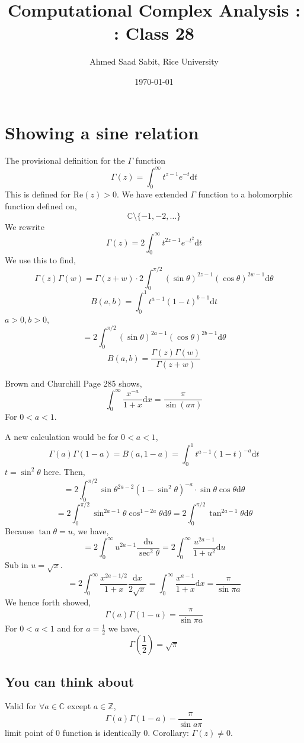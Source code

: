 \documentclass[letter]{article}
\title{Computational Complex Analysis : : Class 28}
\author{Ahmed Saad Sabit, Rice University}
\date{\today}
\begin{document}
\maketitle
\section*{Showing a sine relation} 

The provisional definition for the $\Gamma$ function
\[
	\Gamma(z) = \int_0^{\infty} t ^{z-1} e^{-t} \mathrm{d} t
\]
This is defined for $\text{Re}(z)>0$. We have extended $\Gamma$ function to a holomorphic function defined on, 
\[
\mathbb{C} \setminus \{-1,-2, \ldots\} 
\] 
We rewrite 
\[
\Gamma(z) = 2 \int_0^{\infty} t ^{2z-1} e^{-t^2} \mathrm{d}  t
\]
We use this to find, 
\[
\Gamma(z) \Gamma(w) = \Gamma(z+w) \cdot 2 \int_0^{\pi / 2} (\sin \theta)^{2z - 1} \left(\cos \theta\right)^{2w - 1} \mathrm{d} \theta
\]
\[
B(a,b) = \int_{0}^{1} t ^{a - 1} (1- t)^{b -1} \mathrm{d} t 
\]
$a>0, b>0$, 
\[
= 2 \int_{0}^{\pi / 2}  (\sin \theta)^{2 a - 1} (\cos \theta)^{2b - 1} \mathrm{d}  \theta 
\]
\[
B(a,b) = \frac{\Gamma(z) \Gamma(w)}{\Gamma(z+w)}
\] 

Brown and Churchill Page 285 shows, 
\[
\int_{0}^{\infty} \frac{x^{-a}}{1+x} \mathrm{d} x = \frac{\pi }{\sin (a \pi )}
\] 
For $0 < a < 1$. 

A new calculation would be for $0 < a < 1$, 
\[
\Gamma(a) \Gamma(1-a) = B(a, 1-a) = \int_{0}^{1} t ^{a- 1} (1- t)^{-a} \mathrm{d} t  
\]
$t = \sin ^2\theta$ here. Then, 
\[
= 2 \int_{0}^{ \pi /2} \sin \theta ^{2a - 2} \left(1 - \sin ^2 \theta\right)^{ - a} \cdot \sin \theta \cos \theta \mathrm{d}  \theta 
\] 
\[
= 2 \int_{ 0 }^{\pi / 2}  \sin ^{2a - 1} \theta \cos ^{1- 2a} \theta \mathrm{d} \theta = 2 \int_{0}^{\pi / 2} \tan ^{2a - 1} \theta \mathrm{d} \theta  
\]
Because $\tan \theta = u$, we have, 
\[
= 2 \int_{0}^{\infty} u ^{2a - 1} \frac{\mathrm{d}  u }{\sec ^2 \theta} = 2 \int_{ 0}^{\infty} \frac{u^{2 a - 1}}{1 + u^2} \mathrm{d}  u  
\] 
Sub in $u = \sqrt{x} $. 
\[
= 2 \int_{0}^{\infty} \frac{x^{2a -1 / 2} }{1+x} \frac{\mathrm{d} x}{2 \sqrt{x} } = 
\int_{ 0}^{\infty} \frac{x^{a-1}}{1+x} \mathrm{d} x  = \frac{\pi}{\sin \pi a}
\] 
We hence forth showed,
\[
\boxed{
\Gamma(a) \Gamma(1-a) = \frac{\pi}{\sin \pi a}
}
\] 
For $0 < a < 1$ and for $a = \frac{1}{2}$ we have, 
\[
\Gamma(\frac{1}{2}) = \sqrt{\pi } 
\] 
\subsection*{You can think about} 
Valid for $\forall a \in \mathbb{C}$ except $a \in \mathbb{Z}$, 
\[
\Gamma(a) \Gamma(1-a) - \frac{\pi}{\sin a \pi } 
\] limit point of $0$ function is identically $0$. Corollary: $\Gamma(z) \neq  0$.  
\end{document}
